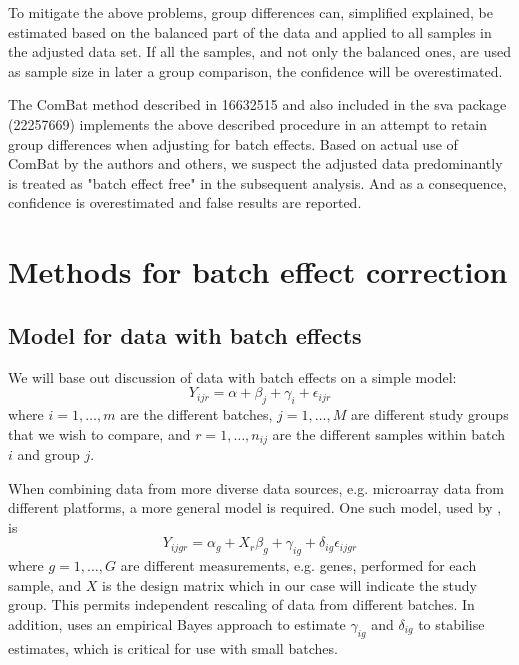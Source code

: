\documentclass{bio}
\begin{document}
To mitigate the above problems, group differences can, simplified explained, be estimated based on the balanced part of the data and applied to all samples in the adjusted data set. If all the samples, and not only the balanced ones, are used as sample size in later a group comparison, the confidence will be overestimated.

The ComBat method described in 16632515 and also included in the sva package (22257669) implements the above described procedure in an attempt to retain group differences when adjusting for batch effects. Based on actual use of ComBat by the authors and others, we suspect the adjusted data predominantly is treated as "batch effect free" in the subsequent analysis. And as a consequence, confidence is overestimated and false results are reported.






\section{Methods for batch effect correction}

\subsection{Model for data with batch effects}

We will base out discussion of data with batch effects on a simple model:
\begin{equation}
Y_{ijr}=\alpha+\beta_j+\gamma_i+\epsilon_{ijr}
\end{equation}
where $i=1,\ldots,m$ are the different batches, $j=1,\ldots,M$ are different study groups that we wish to compare, and $r=1,\ldots,n_{ij}$ are the different samples within batch $i$ and group $j$.

When combining data from more diverse data sources, e.g. microarray data from different platforms, a more general model is required. One such model, used by , is
\begin{equation}
Y_{ijgr}=\alpha_g+X_r\beta_{g}+\gamma_{ig}+\delta_{ig}\epsilon_{ijgr}
\end{equation}
where $g=1,\ldots,G$ are different measurements, e.g. genes, performed for each sample, and $X$ is the design matrix which in our case will indicate the study group. This permits independent rescaling of data from different batches. In addition,  uses an empirical Bayes approach to estimate $\gamma_{ig}$ and $\delta_{ig}$ to stabilise estimates, which is critical for use with small batches.
\end{document}
